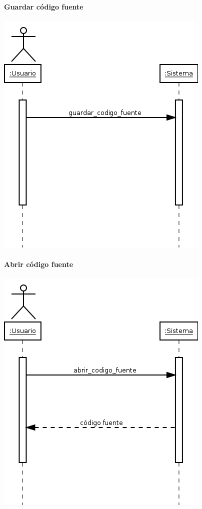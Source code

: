 \paragraph{Guardar código fuente}
\begin{center}
\includegraphics[scale=0.4]{guardar_codigo_fuente.png} \\
\end{center}
\paragraph{Abrir código fuente}
\begin{center}
\includegraphics[scale=0.4]{abrir_codigo_fuente.png} \\
\end{center}

